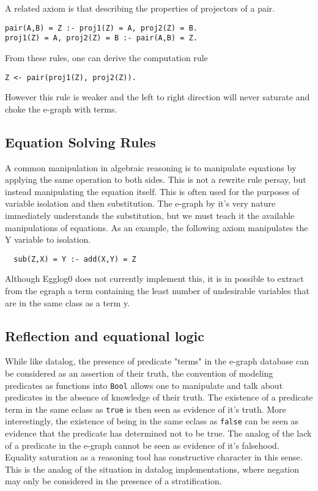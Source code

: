 \documentclass[sigplan,10pt,review,anonymous]{acmart}
\begin{document}
A related axiom is that describing the properties of projectors of a pair.

\begin{lstlisting}
pair(A,B) = Z :- proj1(Z) = A, proj2(Z) = B.
proj1(Z) = A, proj2(Z) = B :- pair(A,B) = Z.
\end{lstlisting}

From these rules, one can derive the computation rule
\begin{lstlisting}
Z <- pair(proj1(Z), proj2(Z)).
\end{lstlisting}
However this rule is weaker and the left to right direction will never saturate and choke the e-graph with terms.

\subsection{Equation Solving Rules}
A common manipulation in algebraic reasoning is to manipulate equations by applying the same operation to both sides. This is not a rewrite rule persay, but instead manipulating the equation itself. This is often used for the purposes of variable isolation and then substitution. The e-graph by it's very nature immediately understands the substitution, but we must teach it the available manipulations of equations. As an example, the following axiom manipulates the Y variable to isolation. 
\begin{lstlisting}
  sub(Z,X) = Y :- add(X,Y) = Z
\end{lstlisting}

Although Egglog0 does not currently implement this, it is in possible to extract from the egraph a term containing the least number of undesirable variables that are in the same class as a term y.

\subsection{Reflection and equational logic}
While like datalog, the presence of predicate "terms" in the e-graph database can be considered as an assertion of their truth, the convention of modeling predicates as functions into \lstinline{Bool} allows one to manipulate and talk about predicates in the absence of knowledge of their truth. The existence of a predicate term in the same eclass as \lstinline{true} is then seen as evidence of it's truth. More interestingly, the existence of being in the same eclass as \lstinline{false} can be seen as evidence that the predicate has determined not to be true. The analog of the lack of a predicate in the e-graph cannot be seen as evidence of it's falsehood. Equality saturation as a reasoning tool has constructive character in this sense. This is the analog of the situation in datalog implementations, where negation may only be considered in the presence of a stratification.
\end{document}
